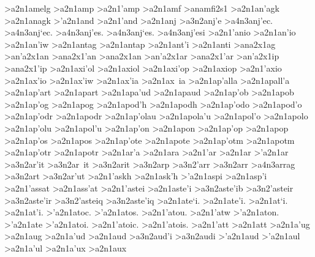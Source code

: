 {>a2n1amelg
>a2n1amp 		%
>a2n1'amp 		%
>a2n1amf 		%
>anamfi2s1 		%
>a2n1an'agk 		%
>a2n1anagk
>'a2n1and 		%
>a2n1'and
>a2n1anj 		%
	>a3n2anj'e 		%
		>a4n3anj'ec. 		%
		>a4n3anj`ec.
		>a4n3anj'es.
		>a4n3anj`es.
		>a4n3anj'esi
>a2n1'anio 		%
>a2n1an'io
>a2n1an'iw
>a2n1antag 		%
>a2n1antap 		%
>a2n1ant'i 		%
>a2n1anti
>ana2x1ag  		%
>an'a2x1an 		%
>ana2x1'an
>ana2x1an 		%
>an'a2x1ar	 	%
>ana2x1'ar
>an'a2x1ip  		%
>ana2x1'ip
>a2n1axi'ol   		%
>a2n1axiol
>a2n1axi'op  		%
>a2n1axiop
>a2n1'axio 		%
>a2n1ax'io
>a2n1ax'iw
>a2n1ax'ia
>a2n1ax~ia
>a2n1ap'alla 		%
>a2n1apall'a
>a2n1ap'art 		%
>a2n1apart
>a2n1apa'ud 		%
>a2n1apaud
>a2n1ap'ob 		%
>a2n1apob
>a2n1ap'og 		%
>a2n1apog
>a2n1apod'h 		%
>a2n1apodh
>a2n1ap'odo 		%
>a2n1apod'o
>a2n1ap'odr 		%
>a2n1apodr
>a2n1ap'olau 		%
>a2n1apola'u
>a2n1apol'o 		%
>a2n1apolo
>a2n1ap'olu 		%
>a2n1apol'u
>a2n1ap'on		%
>a2n1apon
>a2n1ap'op 		%
>a2n1apop 
>a2n1ap'os 		%
>a2n1apos
>a2n1ap'ote 		%
>a2n1apote
>a2n1ap'otm 		%
>a2n1apotm
>a2n1ap'otr 		%
>a2n1apotr
>a2n1ar'a 		%
>a2n1ara
>a2n1'ar    		%
>a2n1ar
>'a2n1ar     		%
	>a3n2ar'it		%
	>a3n2ar~it		%
	>a3n2arit		%
	>a3n2arp		%
	>a3n2'arr 		%
	>a3n2arr  		
		>a4n3arrag 		%
	>a3n2art		%
	>a3n2ar'ut		%
>a2n1'askh 		%
>a2n1ask'h
>'a2n1aspi 		%
>a2n1asp'i
>a2n1'assat 		%
>a2n1ass'at
>a2n1'astei 		%
>a2n1aste'i
	>a3n2aste'ib    	%
	>a3n2'asteir		%
	>a3n2aste'ir
	>a3n2'asteiq		%
	>a3n2aste'iq
>a2n1ate`i. 		%
>a2n1ate'i.
>a2n1at`i. 		%
>a2n1at'i.
>'a2n1atoc.		%
>'a2n1atos.
>a2n1'atou.
>a2n1'atw
>'a2n1aton.
>'a2n1ate
>'a2n1atoi.
>a2n1'atoic.
>a2n1'atois.	
>a2n1'att 		%
>a2n1att
>a2n1a'ug 		%
>a2n1aug
>a2n1a'ud 		%
>a2n1aud
	>a3n2aud'i 		%
	>a3n2audi
>'a2n1aud 		%
>'a2n1aul 		%
>a2n1a'ul
>a2n1a'ux 		%
>a2n1aux 
}

